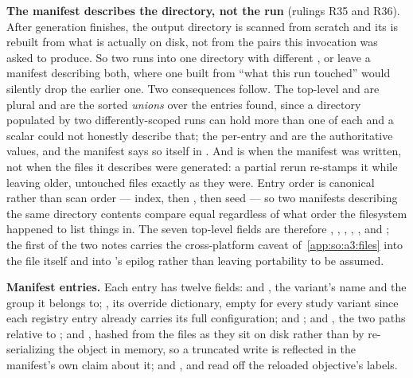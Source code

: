 \textbf{The manifest describes the directory, not the run} (rulings R35 and
R36). After generation finishes, the output directory is scanned from scratch and its
 is rebuilt from what is actually on disk, not from
the pairs this invocation was asked to produce. So two runs into one directory
with different ,  or  leave a
manifest describing both, where one built from ``what this run touched'' would
silently drop the earlier one. Two consequences follow. The top-level
 and  are plural and are the sorted \emph{unions} over
the entries found, since a directory populated by two differently-scoped runs
can hold more than one of each and a scalar could not honestly describe that;
the per-entry  and  are the authoritative values, and the
manifest says so itself in . And  is when
the manifest was written, not when the files it describes were generated: a
partial rerun re-stamps it while leaving older, untouched files exactly as they
were. Entry order is canonical rather than scan order --- 
index, then , then seed --- so two manifests describing the same
directory contents compare equal regardless of what order the filesystem
happened to list things in. The seven top-level fields are therefore
, , , ,
,  and ; the first of
the two notes carries the cross-platform
caveat of~\ref{app:so:a3:files} into the file itself and into
's epilog rather than leaving portability to be assumed.

\textbf{Manifest entries.} Each entry has twelve fields:  and
, the variant's name and the group it belongs to;
, its  override dictionary, empty for
every study variant since each registry entry already carries its full
configuration;  and ;  and ,
the two paths relative to ;  and
, hashed from the files as they sit on disk rather than by
re-serializing the object in memory, so a truncated write is reflected in the
manifest's own claim about it; and ,  and
 read off the reloaded objective's labels.

